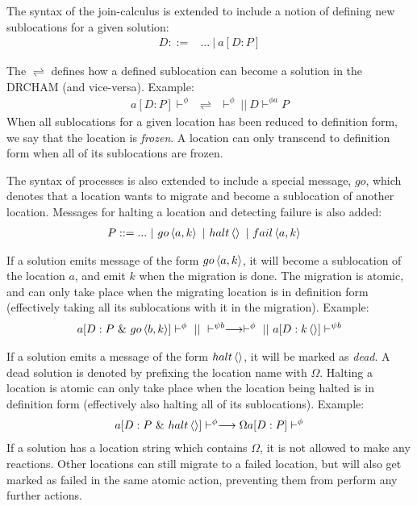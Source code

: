 The syntax of the join-calculus is extended to include a notion of defining new
sublocations for a given solution:
\begin{align*}
 D ::={}& ... ~|~ a[D : P]
\end{align*}

The $\rightleftharpoons$ defines how a defined sublocation can become a solution
in the DRCHAM (and vice-versa). Example:
\begin{align*}
 a[D : P] \vdash^\phi\ \  \rightleftharpoons \ \  \vdash^\phi ~||~ D \vdash^{\phi a} P
\end{align*}
When all sublocations for a given location has been reduced to definition form,
we say that the location is \emph{frozen}. A location can only transcend to
definition form when all of its sublocations are frozen.

The syntax of processes is also extended to include a special message, $go$,
which denotes that a location wants to migrate and become a sublocation of
another location. Messages for halting a location and detecting failure is also
added:
\begin{align*}
 P ::={}& ... ~|~ \atm go<a,k> ~|~ \atm halt<> ~|~ \atm fail<a,k>
\end{align*}

If a solution emits message of the form $\atm go<a,k>$, it will become a
sublocation of the location $a$, and emit $k$ when the migration is done. The
migration is atomic, and can only take place when the migrating location is in
definition form (effectively taking all its sublocations with it in the
migration). Example:
\begin{align*}
 a[D : P ~\&~ \atm go<b,k>] \vdash^\phi ~||~ \vdash^{\psi b}
\longrightarrow \vdash^\phi ~||~ a[D : \atm k<>] \vdash^{\psi b}
\end{align*}

If a solution emits a message of the form $\atm halt<>$, it will be marked as
\emph{dead}. A dead solution is denoted by prefixing the location name with
$\Omega$. Halting a location is atomic can only take place when the location
being halted is in definition form (effectively also halting all of its
sublocations). Example:
\begin{align*}
  a[D : P ~\&~ \atm halt<>] \vdash^\phi \longrightarrow \Omega a[D : P] \vdash^\phi
\end{align*}
If a solution has a location string which contains $\Omega$, it is not allowed
to make any reactions. Other locations can still migrate to a failed location,
but will also get marked as failed in the same atomic action, preventing them
from perform any further actions.

